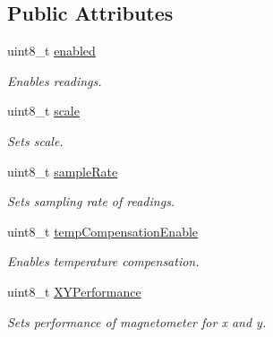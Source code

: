 \subsection*{Public Attributes}
\begin{DoxyCompactItemize}
\item 
\mbox{\label{structmagSettings_a97f8e5c4baf3fc9a662f84fedb188f3c}} 
uint8\+\_\+t \hyperlink{structmagSettings_a97f8e5c4baf3fc9a662f84fedb188f3c}{enabled}
\begin{DoxyCompactList}\small\item\em Enables readings. \end{DoxyCompactList}\item 
\mbox{\label{structmagSettings_a5966915104376cb76d9eb787bab024bc}} 
uint8\+\_\+t \hyperlink{structmagSettings_a5966915104376cb76d9eb787bab024bc}{scale}
\begin{DoxyCompactList}\small\item\em Sets scale. \end{DoxyCompactList}\item 
\mbox{\label{structmagSettings_aca3dbf81e533dce344e618a3df199c1e}} 
uint8\+\_\+t \hyperlink{structmagSettings_aca3dbf81e533dce344e618a3df199c1e}{sample\+Rate}
\begin{DoxyCompactList}\small\item\em Sets sampling rate of readings. \end{DoxyCompactList}\item 
\mbox{\label{structmagSettings_afcfa1e532fa140e42dc34a4abd7926ae}} 
uint8\+\_\+t \hyperlink{structmagSettings_afcfa1e532fa140e42dc34a4abd7926ae}{temp\+Compensation\+Enable}
\begin{DoxyCompactList}\small\item\em Enables temperature compensation. \end{DoxyCompactList}\item 
\mbox{\label{structmagSettings_ad36c7bb251858fb289841c91fb615a5f}} 
uint8\+\_\+t \hyperlink{structmagSettings_ad36c7bb251858fb289841c91fb615a5f}{X\+Y\+Performance}
\begin{DoxyCompactList}\small\item\em Sets performance of magnetometer for x and y. \end{DoxyCompactList}\item 

\end{DoxyCompactItemize}

